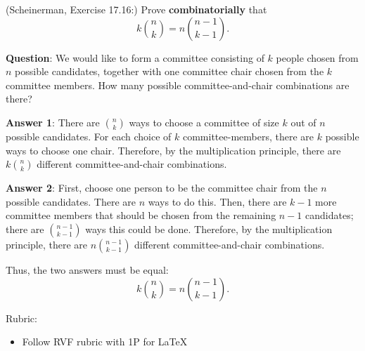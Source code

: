 \documentclass{article}
\theoremstyle{definition}
\begin{document}
\begin{question}
    (Scheinerman, Exercise 17.16:)
    Prove \textbf{combinatorially} that
    \[ k \binom{n}{k}  = n \binom{n-1}{k-1}. \]
\end{question}
\begin{solution}
\textbf{Question}: We would like to form a committee consisting of $k$ people chosen from $n$ possible candidates, together with one committee chair chosen from the $k$ committee members.  How many possible committee-and-chair combinations are there?

\textbf{Answer 1}: There are $\binom{n}{k}$ ways to choose a committee of size $k$ out of $n$ possible candidates.  For each choice of $k$ committee-members, there are $k$ possible ways to choose one chair.  Therefore, by the multiplication principle, there are $k \binom{n}{k}$ different committee-and-chair combinations.

\textbf{Answer 2}: First, choose one person to be the committee chair from the $n$ possible candidates.  There are $n$ ways to do this.  Then, there are $k-1$ more committee members that should be chosen from the remaining $n-1$ candidates; there are $\binom{n-1}{k-1}$ ways this could be done.  Therefore, by the multiplication principle, there are $n \binom{n-1}{k-1}$ different committee-and-chair combinations.

Thus, the two answers must be equal:
\[ k \binom{n}{k} = n \binom{n-1}{k-1}. \]

{\color{red} Rubric:
\begin{itemize}
\item Follow RVF rubric with 1P for \LaTeX
\end{itemize}}
\end{solution}
\end{document}
